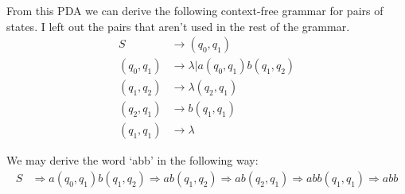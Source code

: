\documentclass{article}
\begin{document}
\begin{enumerate}
\begin{center}
  \end{center}
  From this PDA we can derive the following context-free grammar for pairs of states. I left out the pairs that aren't used in the rest of the grammar.
  \begin{align*}
    S &\rightarrow (q_0, q_1) \\
    (q_0, q_1) &\rightarrow \lambda | a(q_0, q_1)b(q_1, q_2) \\
    (q_1, q_2) &\rightarrow \lambda(q_2, q_1)  \\
    (q_2, q_1) &\rightarrow b(q_1, q_1) \\
    (q_1, q_1) &\rightarrow \lambda
  \end{align*}

  We may derive the word `abb' in the following way:
  \begin{align*}
    S &\Rightarrow a(q_0, q_1)b(q_1, q_2) \Rightarrow ab(q_1, q_2) \Rightarrow ab(q_2, q_1) \Rightarrow abb(q_1, q_1) \Rightarrow abb
  \end{align*}

\end{enumerate}
\end{document}
